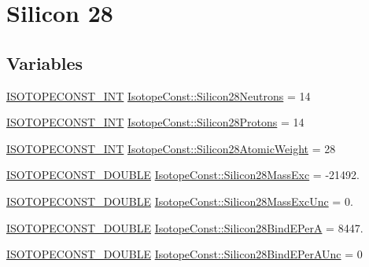 \hypertarget{group___isotope_const-_silicon-_si28}{}\section{Silicon 28}
\label{group___isotope_const-_silicon-_si28}
\subsection*{Variables}
\begin{DoxyCompactItemize}
\item 
\mbox{\hyperlink{group___isotope_const-_macros_ga5f18360b3e99483a35c32d789e62621c}{I\+S\+O\+T\+O\+P\+E\+C\+O\+N\+S\+T\+\_\+\+I\+NT}} \mbox{\hyperlink{group___isotope_const-_silicon-_si28_ga084cc57cdde125e2c2ad7a2d3385153a}{Isotope\+Const\+::\+Silicon28\+Neutrons}} = 14
\item 
\mbox{\hyperlink{group___isotope_const-_macros_ga5f18360b3e99483a35c32d789e62621c}{I\+S\+O\+T\+O\+P\+E\+C\+O\+N\+S\+T\+\_\+\+I\+NT}} \mbox{\hyperlink{group___isotope_const-_silicon-_si28_ga1da1e0956fa0186d3f8fcea3f3d4b350}{Isotope\+Const\+::\+Silicon28\+Protons}} = 14
\item 
\mbox{\hyperlink{group___isotope_const-_macros_ga5f18360b3e99483a35c32d789e62621c}{I\+S\+O\+T\+O\+P\+E\+C\+O\+N\+S\+T\+\_\+\+I\+NT}} \mbox{\hyperlink{group___isotope_const-_silicon-_si28_gadf3b2a4fefeb59528ae3f1417ba5b983}{Isotope\+Const\+::\+Silicon28\+Atomic\+Weight}} = 28
\item 
\mbox{\hyperlink{group___isotope_const-_macros_ga8f45a7272ce02c0b4c65c44636ed719a}{I\+S\+O\+T\+O\+P\+E\+C\+O\+N\+S\+T\+\_\+\+D\+O\+U\+B\+LE}} \mbox{\hyperlink{group___isotope_const-_silicon-_si28_ga5017203355db343a68bb5db3ee888903}{Isotope\+Const\+::\+Silicon28\+Mass\+Exc}} = -\/21492.
\item 
\mbox{\hyperlink{group___isotope_const-_macros_ga8f45a7272ce02c0b4c65c44636ed719a}{I\+S\+O\+T\+O\+P\+E\+C\+O\+N\+S\+T\+\_\+\+D\+O\+U\+B\+LE}} \mbox{\hyperlink{group___isotope_const-_silicon-_si28_ga4d6bd791b6cf5e27bbc90f328961ca22}{Isotope\+Const\+::\+Silicon28\+Mass\+Exc\+Unc}} = 0.
\item 
\mbox{\hyperlink{group___isotope_const-_macros_ga8f45a7272ce02c0b4c65c44636ed719a}{I\+S\+O\+T\+O\+P\+E\+C\+O\+N\+S\+T\+\_\+\+D\+O\+U\+B\+LE}} \mbox{\hyperlink{group___isotope_const-_silicon-_si28_ga5619376315958769956131ab9453b3e9}{Isotope\+Const\+::\+Silicon28\+Bind\+E\+PerA}} = 8447.
\item 
\mbox{\hyperlink{group___isotope_const-_macros_ga8f45a7272ce02c0b4c65c44636ed719a}{I\+S\+O\+T\+O\+P\+E\+C\+O\+N\+S\+T\+\_\+\+D\+O\+U\+B\+LE}} \mbox{\hyperlink{group___isotope_const-_silicon-_si28_ga359676171d7da476271d3bd6dc19f89f}{Isotope\+Const\+::\+Silicon28\+Bind\+E\+Per\+A\+Unc}} = 0

\end{DoxyCompactItemize}

